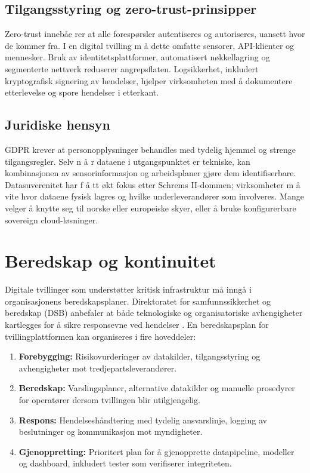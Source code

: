 \subsection{Tilgangsstyring og zero-trust-prinsipper}
Zero-trust innebåe rer at alle forespørsler autentiseres og autoriseres, uansett hvor de kommer fra. I en digital tvilling m å dette omfatte sensorer, API-klienter og mennesker. Bruk av identitetsplattformer, automatisert nøkkellagring og segmenterte nettverk reduserer angrepsflaten. Logsikkerhet, inkludert kryptografisk signering av hendelser, hjelper virksomheten med  å dokumentere etterlevelse og spore hendelser i etterkant.

\subsection{Juridiske hensyn}
GDPR krever at personopplysninger behandles med tydelig hjemmel og strenge tilgangsregler. Selv n å r dataene i utgangspunktet er tekniske, kan kombinasjonen av sensorinformasjon og arbeidsplaner gjøre dem identifiserbare. Datasuverenitet har f å tt økt fokus etter Schrems II-dommen; virksomheter m å vite hvor dataene fysisk lagres og hvilke underleverandører som involveres. Mange velger  å knytte seg til norske eller europeiske skyer, eller  å bruke konfigurerbare sovereign cloud-løsninger.

\section{Beredskap og kontinuitet}
Digitale tvillinger som understøtter kritisk infrastruktur må inngå i organisasjonens beredskapsplaner. Direktoratet for
samfunnssikkerhet og beredskap (DSB) anbefaler at både teknologiske og organisatoriske avhengigheter kartlegges for å sikre
responsevne ved hendelser \citep{dsb2023nrb}. En beredskapsplan for tvillingplattformen kan organiseres i fire hoveddeler:
\begin{enumerate}
    \item \textbf{Forebygging:} Risikovurderinger av datakilder, tilgangsstyring og avhengigheter mot tredjepartsleverandører.
    \item \textbf{Beredskap:} Varslingsplaner, alternative datakilder og manuelle prosedyrer for operatører dersom tvillingen blir utilgjengelig.
    \item \textbf{Respons:} Hendelseshåndtering med tydelig ansvarslinje, logging av beslutninger og kommunikasjon mot myndigheter.
    \item \textbf{Gjenoppretting:} Prioritert plan for å gjenopprette datapipeline, modeller og dashboard, inkludert tester som verifiserer integriteten.
\end{enumerate}

